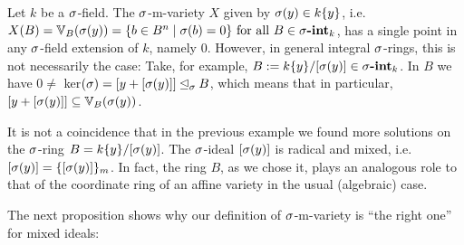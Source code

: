 \begin{ex}
Let $k$ be a $\sigma$-field. The $\sigma$-m-variety $X$ given by $\sigma(y) \in k\{y\}$, i.e. $X(B) = \mathbb{V}_B(\sigma(y)) = \{ b \in B^n \mid \sigma(b) = 0 \} \text{ for all } B \in \sigma\text{{\normalfont\textbf{-int}}}_k$, has a single point in any $\sigma$-field extension of $k$, namely $0$. However, in general integral $\sigma$-rings,
this is not necessarily the case: Take, for example, $B:= k\{y\}/[\sigma(y)] \in \sigma\text{{\normalfont\textbf{-int}}}_k$. In $B$ we have $0 \neq $ ker$(\sigma) = [y+ [\sigma(y)]] \unlhd_{\sigma} B$, which means that in particular, $[y + [\sigma(y)]] \subseteq \mathbb{V}_B(\sigma(y))$.
\end{ex}

It is not a coincidence that in the previous example we found more solutions on the $\sigma$-ring $B = k\{y\}/[\sigma(y)]$. The $\sigma$-ideal $[\sigma(y)]$ is radical and mixed, i.e. $[\sigma(y)] = \{ [\sigma(y)] \}_m$.
In fact, the ring $B$, as we chose it, plays an analogous role to that of the coordinate ring of an affine variety in the usual (algebraic) case.

The next proposition shows why our definition of $\sigma$-m-variety is ``the right one'' for mixed ideals:

